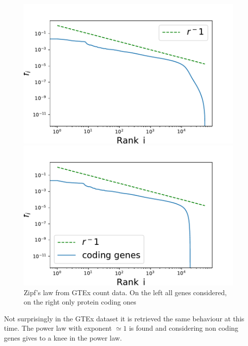 \begin{figure}[htb!]
    \centering
    \begin{minipage}{0.45\textwidth}
    \includegraphics[width=0.95\linewidth]{pictures/structure/gtex/globalZipf.pdf}
    \end{minipage}
    \hspace{3mm}
    \begin{minipage}{0.45\textwidth}
    \includegraphics[width=0.95\linewidth]{pictures/structure/gtex/globalZipf_c.pdf}
    \end{minipage}
    \caption{Zipf's law from GTEx count data. On the left all genes considered, on the right only protein coding ones}
    \label{fig:my_label}
\end{figure}
Not surprisingly in the GTEx dataset it is retrieved the same behaviour at this time. The power law with exponent $\simeq 1$ is found and considering non coding genes gives to a knee in the power law.

